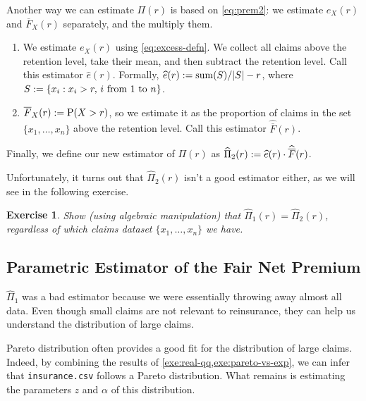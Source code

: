\documentclass[12pt]{article}
\newcommand*{\Fbar}{\overline{F}}
\newcommand*{\Fbarhat}{\widehat{\Fbar}}
\newcommand*{\ehat}{\widehat{e}}
\newcommand*{\Pihat}{\widehat{\Pi}}
\newtheorem{exercise}{Exercise}[section]
\begin{document}
Another way we can estimate $\Pi(r)$ is based on \cref{eq:prem2}:
we estimate $e_X(r)$ and $\Fbar_X(r)$ separately, and the multiply them.
\begin{enumerate}
\item We estimate $e_X(r)$ using \cref{eq:excess-defn}.
    We collect all claims above the retention level, take their mean,
    and then subtract the retention level. Call this estimator $\ehat(r)$.
    Formally, $\ehat(r) \defeq \mathrm{sum}(S)/|S| - r$,
    where $S := \{x_i: x_i > r, \,i \text{ from } 1 \text{ to } n\}$.
\item $\Fbar_X(r) \defeq \Pr(X > r)$, so we estimate it as the proportion of
    claims in the set $\{x_1, \ldots, x_n\}$ above the retention level.
    Call this estimator $\Fbarhat(r)$.
\end{enumerate}
Finally, we define our new estimator of $\Pi(r)$ as
$\Pihat_2(r) \defeq \ehat(r)\cdot\Fbarhat(r)$.

Unfortunately, it turns out that $\Pihat_2(r)$ isn't a good estimator either,
as we will see in the following exercise.

\begin{tcolorbox}[mathExe]
\begin{exercise}
\label{exe:pihat1-eq-pihat2}
Show (using algebraic manipulation) that $\Pihat_1(r) = \Pihat_2(r)$,
regardless of which claims dataset $\{x_1, \ldots, x_n\}$ we have.
\end{exercise}
\end{tcolorbox}

\subsection{Parametric Estimator of the Fair Net Premium}

$\Pihat_1$ was a bad estimator because we were essentially throwing away almost all data.
Even though small claims are not relevant to reinsurance,
they can help us understand the distribution of large claims.

Pareto distribution often provides a good fit for the distribution of large claims.
Indeed, by combining the results of \cref{exe:real-qq,exe:pareto-vs-exp},
we can infer that \texttt{insurance.csv} follows a Pareto distribution.
What remains is estimating the parameters $z$ and $\alpha$ of this distribution.
\end{document}
